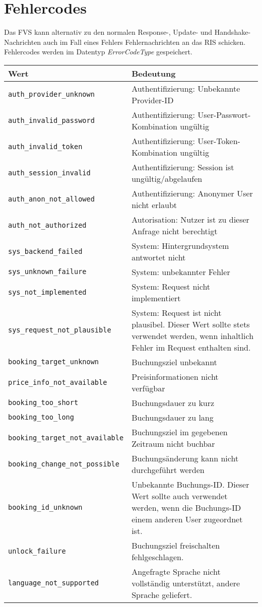 \section{Fehlercodes}
\label{sec:CodeTabellen:ErrorCode}
Das FVS kann alternativ zu den normalen Response-, Update- und Handshake-Nachrichten auch im Fall eines Fehlers Fehlernachrichten an das RIS schicken. Fehlercodes werden im Datentyp \emph{ErrorCodeType} gespeichert.
\begin{flushleft}
\begin{tabularx}{\linewidth}{l>{\raggedright\arraybackslash}X} 
\toprule
Wert & Bedeutung\\
\midrule
\verb|auth_provider_unknown| & Authentifizierung: Unbekannte Provider-ID\\
\verb|auth_invalid_password| & Authentifizierung: User-Passwort-Kombination ungültig\\
\verb|auth_invalid_token| & Authentifizierung: User-Token-Kombination ungültig\\
\verb|auth_session_invalid| & Authentifizierung: Session ist ungültig/abgelaufen\\
\verb|auth_anon_not_allowed| & Authentifizierung: Anonymer User nicht erlaubt\\
\verb|auth_not_authorized| & Autorisation: Nutzer ist zu dieser Anfrage nicht berechtigt\\
\verb|sys_backend_failed| & System: Hintergrundsystem antwortet nicht\\
\verb|sys_unknown_failure| & System: unbekannter Fehler\\
\verb|sys_not_implemented| & System: Request nicht implementiert\\
\verb|sys_request_not_plausible| & System: Request ist nicht plausibel. Dieser Wert sollte stets verwendet werden, wenn inhaltlich Fehler im Request enthalten sind.\\
\verb|booking_target_unknown| & Buchungsziel unbekannt\\
\verb|price_info_not_available| & Preisinformationen nicht verfügbar\\
\verb|booking_too_short| & Buchungsdauer zu kurz\\
\verb|booking_too_long| & Buchungsdauer zu lang\\
\verb|booking_target_not_available| & Buchungsziel im gegebenen Zeitraum nicht buchbar\\
\verb|booking_change_not_possible| & Buchungsänderung kann nicht durchgeführt werden\\
\verb|booking_id_unknown| & Unbekannte Buchungs-ID. Dieser Wert sollte auch verwendet werden, wenn die Buchungs-ID einem anderen User zugeordnet ist.\\
\verb|unlock_failure| & Buchungsziel freischalten fehlgeschlagen.\\
\verb|language_not_supported| & Angefragte Sprache nicht vollständig unterstützt, andere Sprache geliefert.\\
\bottomrule
\end{tabularx}
\end{flushleft}
